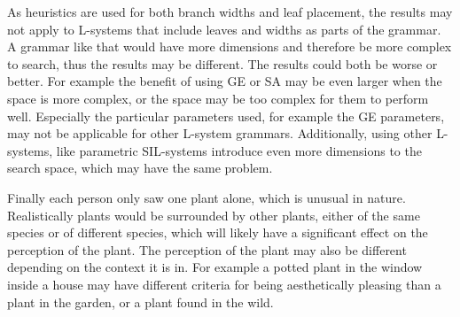 As heuristics are used for both branch widths and leaf placement, the results may not apply to \glspl{L-system} that include leaves and widths as parts of the grammar.
A grammar like that would have more dimensions and therefore be more complex to search, thus the results may be different.
The results could both be worse or better.
For example the benefit of using \gls{GE} or \gls{SA} may be even larger when the space is more complex, or the space may be too complex for them to perform well.
Especially the particular parameters used, for example the \gls{GE} parameters, may not be applicable for other \gls{L-system} grammars.
Additionally, using other \glspl{L-system}, like parametric SIL-systems introduce even more dimensions to the search space, which may have the same problem.

Finally each person only saw one plant alone, which is unusual in nature.
Realistically plants would be surrounded by other plants, either of the same species or of different species, which will likely have a significant effect on the perception of the plant.
The perception of the plant may also be different depending on the context it is in.
For example a potted plant in the window inside a house may have different criteria for being aesthetically pleasing than a plant in the garden, or a plant found in the wild.

